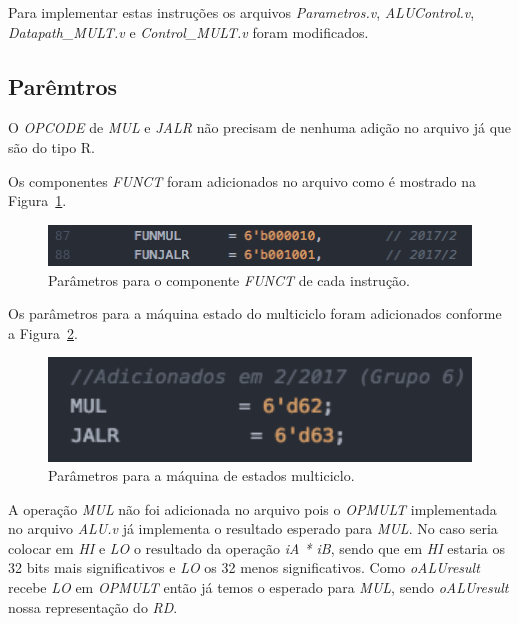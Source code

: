 \documentclass[12pt]{article}
\begin{document}
Para implementar estas instruções os arquivos \textit{Parametros.v}, \textit{ALUControl.v}, \textit{Datapath\_MULT.v} e \textit{Control\_MULT.v} foram modificados. 

\subsection{Parêmtros}
\label{subsec:param}

O \textit{OPCODE} de \textit{MUL} e \textit{JALR} não precisam de nenhuma adição no arquivo já que são do tipo R.

Os componentes \textit{FUNCT} foram adicionados no arquivo como é mostrado na Figura~\ref{fig:pfunct}.

\begin{figure}[H]
	\flushleft
	\includegraphics[width=1\textwidth]{pfunct.png}
	\caption{Parâmetros para o componente \textit{FUNCT} de cada instrução.}
	\label{fig:pfunct}
\end{figure}

Os parâmetros para a máquina estado do multiciclo foram adicionados conforme a Figura~\ref{fig:pest}.

\begin{figure}[H]
	\flushleft
	\includegraphics[width=1\textwidth]{pest.png}
	\caption{Parâmetros para a máquina de estados multiciclo.}
	\label{fig:pest}
\end{figure}

A operação \textit{MUL} não foi adicionada no arquivo pois o \textit{OPMULT} implementada no arquivo \textit{ALU.v} já implementa o resultado esperado para \textit{MUL}. No caso seria colocar em \textit{HI} e \textit{LO} o resultado da operação \textit{iA * iB}, sendo que em \textit{HI} estaria os 32 bits mais significativos e \textit{LO} os 32 menos significativos. Como \textit{oALUresult} recebe \textit{LO} em \textit{OPMULT} então já temos o esperado para \textit{MUL}, sendo \textit{oALUresult} nossa representação do \textit{RD}.
\end{document}
